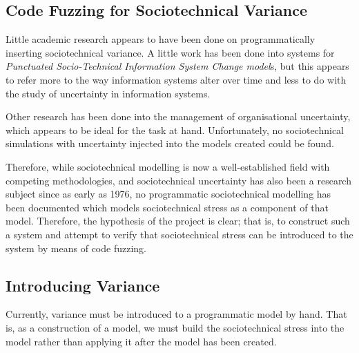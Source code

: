 \subsection{Code Fuzzing for Sociotechnical Variance}
Little academic research appears to have been done on programmatically inserting sociotechnical variance. A little work has been done into systems for \emph{Punctuated Socio-Technical Information System Change model}s\cite{Lyytinen2008}, but this appears to refer more to the way information systems alter over time and less to do with the study of uncertainty in information systems. \par
Other research has been done into the management of organisational uncertainty\cite{Grote2004}\cite{Herrmann1999}, which appears to be ideal for the task at hand. Unfortunately, no sociotechnical simulations with uncertainty injected into the models created could be found. \par
Therefore, while sociotechnical modelling is now a well-established field with competing methodologies, and sociotechnical uncertainty has also been a research subject since as early as 1976\cite{Susman1976}, no programmatic sociotechnical modelling has been documented which models sociotechnical stress as a component of that model. Therefore, the hypothesis of the project is clear; that is, to construct such a system and attempt to verify that sociotechnical stress can be introduced to the system by means of code fuzzing. \par


\subsection{Introducing Variance}
\label{Variance_research}
Currently, variance must be introduced to a programmatic model by hand. That is, as a construction of a model, we must build the sociotechnical stress into the model rather than applying it after the model has been created. \par
 \par

